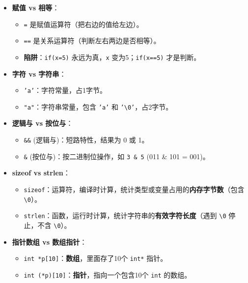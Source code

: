 \documentclass[a4paper,12pt]{article}
\begin{document}
\begin{itemize}
    \item \textbf{赋值 vs 相等}：
    \begin{itemize}
        \item \texttt{=} 是赋值运算符（把右边的值给左边）。
        \item \texttt{==} 是关系运算符（判断左右两边是否相等）。
        \item \textbf{陷阱}：\texttt{if(x=5)} 永远为真，\texttt{x} 变为5；\texttt{if(x==5)} 才是判断。
    \end{itemize}

    \item \textbf{字符 vs 字符串}：
    \begin{itemize}
        \item \texttt{'a'}：字符常量，占1字节。
        \item \texttt{"a"}：字符串常量，包含 \texttt{'a'} 和 \texttt{'\textbackslash 0'}，占2字节。
    \end{itemize}

    \item \textbf{逻辑与 vs 按位与}：
    \begin{itemize}
        \item \texttt{\&\&} (逻辑与)：短路特性，结果为 0 或 1。
        \item \texttt{\&} (按位与)：按二进制位操作，如 \texttt{3 \& 5} (011 \& 101 = 001)。
    \end{itemize}

    \item \textbf{sizeof vs strlen}：
    \begin{itemize}
        \item \texttt{sizeof}：运算符，编译时计算，统计类型或变量占用的\textbf{内存字节数}（包含 \texttt{\textbackslash 0}）。
        \item \texttt{strlen}：函数，运行时计算，统计字符串的\textbf{有效字符长度}（遇到 \texttt{\textbackslash 0} 停止，不含 \texttt{\textbackslash 0}）。
    \end{itemize}

    \item \textbf{指针数组 vs 数组指针}：
    \begin{itemize}
        \item \texttt{int *p[10]}：\textbf{数组}，里面存了10个 \texttt{int*} 指针。
        \item \texttt{int (*p)[10]}：\textbf{指针}，指向一个包含10个 \texttt{int} 的数组。
    \end{itemize}


\end{itemize}
\end{document}
